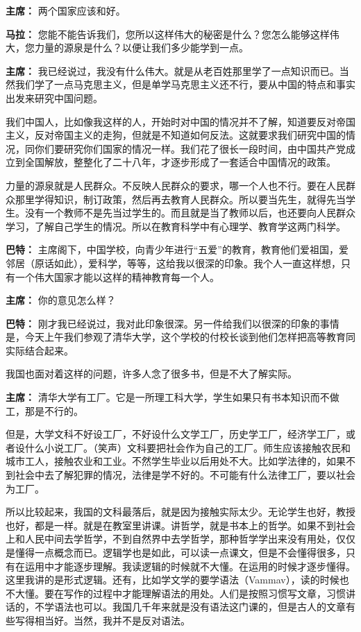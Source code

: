 \begin{duihua}
\item[\textbf{主席：}] 两个国家应该和好。

\item[\textbf{马拉：}] 您能不能告诉我们，您所以这样伟大的秘密是什么？您怎么能够这样伟大，您力量的源泉是什么？以便让我们多少能学到一点。

\item[\textbf{主席：}] 我已经说过，我没有什么伟大。就是从老百姓那里学了一点知识而已。当然我们学了一点马克思主义，但是单学马克思主义还不行，要从中国的特点和事实出发来研究中国问题。

我们中国人，比如像我这样的人，开始时对中国的情况并不了解，知道要反对帝国主义，反对帝国主义的走狗，但就是不知道如何反法。这就要求我们研究中国的情况，同你们要研究你们国家的情况一样。我们花了很长一段时间，由中国共产党成立到全国解放，整整化了二十八年，才逐步形成了一套适合中国情况的政策。

力量的源泉就是人民群众。不反映人民群众的要求，哪一个人也不行。要在人民群众那里学得知识，制订政策，然后再去教育人民群众。所以要当先生，就得先当学生。没有一个教师不是先当过学生的。而且就是当了教师以后，也还要向人民群众学习，了解自己学生的情况。所以在教育科学中有心理学、教育学这两门科学。

\item[\textbf{巴特：}] 主席阁下，中国学校，向青少年进行“五爱”的教育，教育他们爱祖国，爱邻居（原话如此），爱科学，等等，这给我以很深的印象。我个人一直这样想，只有一个伟大国家才能以这样的精神教育每一个人。

\item[\textbf{主席：}] 你的意见怎么样？

\item[\textbf{巴特：}] 刚才我已经说过，我对此印象很深。另一件给我们以很深的印象的事情是，今天上午我们参观了清华大学，这个学校的付校长谈到他们怎样把高等教育同实际结合起来。

我国也面对着这样的问题，许多人念了很多书，但是不大了解实际。

\item[\textbf{主席：}] 清华大学有工厂。它是一所理工科大学，学生如果只有书本知识而不做工，那是不行的。

但是，大学文科不好设工厂，不好设什么文学工厂，历史学工厂，经济学工厂，或者设什么小说工厂。（笑声）文科要把社会作为自己的工厂。师生应该接触农民和城市工人，接触农业和工业。不然学生毕业以后用处不大。比如学法律的，如果不到社会中去了解犯罪的情况，法律是学不好的。不可能有什么法律工厂，要以社会为工厂。

所以比较起来，我国的文科最落后，就是因为接触实际太少。无论学生也好，教授也好，都是一样。就是在教室里讲课。讲哲学，就是书本上的哲学。如果不到社会上和人民中间去学哲学，不到自然界中去学哲学，那种哲学学出来没有用处，仅仅是懂得一点概念而已。逻辑学也是如此，可以读一点课文，但是不会懂得很多，只有在运用中才能逐步理解。我读逻辑的时候就不大懂。在运用的时候才逐步懂得。这里我讲的是形式逻辑。还有，比如学文学的要学语法（Vammav），读的时候也不大懂。要在写作的过程中才能理解语法的用处。人们是按照习惯写文章，习惯讲话的，不学语法也可以。我国几千年来就是没有语法这门课的，但是古人的文章有些写得相当好。当然，我并不是反对语法。


\end{duihua}
